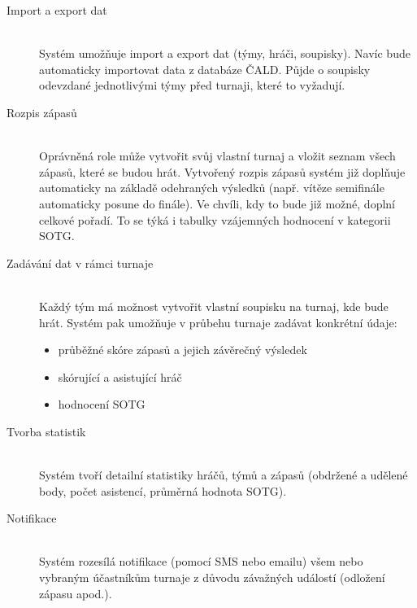 \documentclass[thesis=B,czech]{FITthesis}[2012/06/26]
\begin{document}
\begin{description}
  \item[Import a export dat] \hfill \\
  Systém umožňuje import a export dat (týmy, hráči, soupisky). Navíc bude automaticky
  importovat data z databáze ČALD. Půjde o soupisky odevzdané jednotlivými týmy
  před turnaji, které to vyžadují.

  \item[Rozpis zápasů] \hfill \\
  Oprávněná role může vytvořit svůj vlastní turnaj a vložit seznam všech zápasů,
  které se budou hrát. Vytvořený rozpis zápasů systém již doplňuje automaticky na základě
  odehraných výsledků (např. vítěze semifinále automaticky posune do finále). Ve chvíli,
  kdy to bude již možné, doplní celkové pořadí. To se týká i tabulky vzájemných hodnocení
  v kategorii SOTG.

  \item[Zadávání dat v rámci turnaje] \hfill \\
  Každý tým má možnost vytvořit vlastní soupisku na turnaj, kde bude hrát. Systém pak umožňuje
  v průbehu turnaje zadávat konkrétní údaje:
  \begin{itemize}
    \item průběžné skóre zápasů a jejich závěrečný výsledek
    \item skórující a asistující hráč
    \item hodnocení SOTG
  \end{itemize}
  
  \item[Tvorba statistik] \hfill \\
  Systém tvoří detailní statistiky hráčů, týmů a zápasů (obdržené a udělené body,
  počet asistencí, průměrná hodnota SOTG).
  
  \item[Notifikace] \hfill \\
  Systém rozesílá notifikace (pomocí SMS nebo emailu) všem nebo vybraným účastníkům
  turnaje z důvodu závažných událostí (odložení zápasu apod.). 
\end{description}

\end{document}
